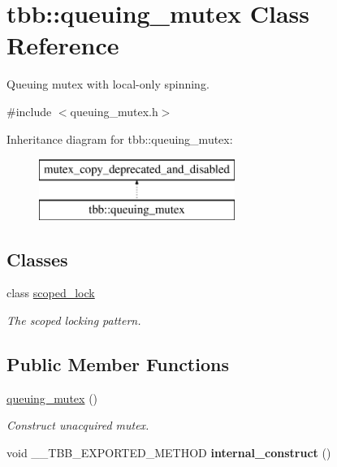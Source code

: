 \hypertarget{classtbb_1_1queuing__mutex}{}\section{tbb\+:\+:queuing\+\_\+mutex Class Reference}
\label{classtbb_1_1queuing__mutex}


Queuing mutex with local-\/only spinning.  




{\ttfamily \#include $<$queuing\+\_\+mutex.\+h$>$}

Inheritance diagram for tbb\+:\+:queuing\+\_\+mutex\+:\begin{figure}[H]
\begin{center}
\leavevmode
\includegraphics[height=2.000000cm]{classtbb_1_1queuing__mutex}
\end{center}
\end{figure}
\subsection*{Classes}
\begin{DoxyCompactItemize}
\item 
class \hyperlink{classtbb_1_1queuing__mutex_1_1scoped__lock}{scoped\+\_\+lock}
\begin{DoxyCompactList}\small\item\em The scoped locking pattern. \end{DoxyCompactList}\end{DoxyCompactItemize}
\subsection*{Public Member Functions}
\begin{DoxyCompactItemize}
\item 
\hypertarget{classtbb_1_1queuing__mutex_a0e58fce2062ae349a30b320b7fdc9155}{}\hyperlink{classtbb_1_1queuing__mutex_a0e58fce2062ae349a30b320b7fdc9155}{queuing\+\_\+mutex} ()\label{classtbb_1_1queuing__mutex_a0e58fce2062ae349a30b320b7fdc9155}

\begin{DoxyCompactList}\small\item\em Construct unacquired mutex. \end{DoxyCompactList}\item 
\hypertarget{classtbb_1_1queuing__mutex_aa017ec6c2bade06da0e9f57d2def25d7}{}void \+\_\+\+\_\+\+T\+B\+B\+\_\+\+E\+X\+P\+O\+R\+T\+E\+D\+\_\+\+M\+E\+T\+H\+O\+D {\bfseries internal\+\_\+construct} ()\label{classtbb_1_1queuing__mutex_aa017ec6c2bade06da0e9f57d2def25d7}

\end{DoxyCompactItemize}
